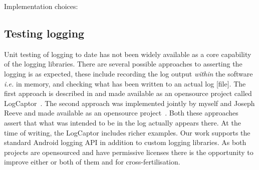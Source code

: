 Implementation choices: 

\subsection{Testing logging}
Unit testing of logging to date has not been widely available as a core capability of the logging libraries. There are several possible approaches to asserting the logging is as expected, these include recording the log output \emph{within} the software \emph{i.e.} in memory, and checking what has been written to an actual log [file]. The first approach is described in \citep{altindag2020_unit_testing_log_messages_made_easy} and made available as an opensource project called LogCaptor~\citep{log-captor-github-project}. The second approach was implemented jointly by myself and Joseph Reeve and made available as an opensource project~\citep{android_log_assert}. Both these approaches assert that what was intended to be in the log actually appears there. At the time of writing, the LogCaptor includes richer examples. Our work supports the standard Android logging API in addition to custom logging libraries. As both projects are opensourced and have permissive licenses there is the opportunity to improve either or both of them and for cross-fertilisation.

